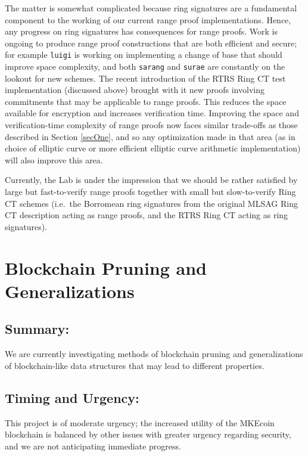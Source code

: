 \documentclass[12pt,english]{mrl}
\theoremstyle{definition}
\numberwithin{equation}{section}
\numberwithin{figure}{section}
\numberwithin{equation}{section}
\numberwithin{equation}{section}
\numberwithin{figure}{section}
\begin{document}
The matter is somewhat complicated because ring signatures are a fundamental component to the working of our current range proof implementations. Hence, any progress on ring signatures has consequences for range proofs. Work is ongoing to produce range proof constructions that are both efficient and secure; for example \texttt{luigi} is working on implementing a change of base that should improve space complexity, and both \texttt{sarang} and \texttt{surae} are constantly on the lookout for new schemes. The recent introduction of the RTRS Ring CT test implementation (discussed above) brought with it new proofs involving commitments that may be applicable to range proofs. This reduces the space available for encryption and increases verification time. Improving the space and verification-time complexity of range proofs now faces similar trade-offs as those described in Section \ref{secOne}, and so any optimization made in that area (as in choice of elliptic curve or more efficient elliptic curve arithmetic implementation) will also improve this area. 

Currently, the Lab is under the impression that we should be rather satisfied by large but fast-to-verify range proofs together with small but slow-to-verify Ring CT schemes (i.e.\ the Borromean ring signatures from the original MLSAG Ring CT description acting as range proofs, and the RTRS Ring CT acting as ring signatures). 





\section{Blockchain Pruning and Generalizations}

\subsection{Summary:} 

We are currently investigating methods of blockchain pruning and generalizations of blockchain-like data structures that may lead to different properties. 

\subsection{Timing and Urgency:} 

This project is of moderate urgency; the increased utility of the MKEcoin blockchain is balanced by other issues with greater urgency regarding security, and we are not anticipating immediate progress.
\end{document}
